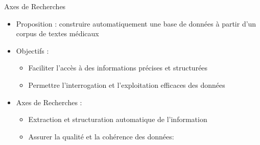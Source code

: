 \documentclass[english,french,table,aspectratio=43]{beamer}
\renewcommand{\_}{\ifincsname_\else\legacyunderscore\fi}
\begin{document}
\begin{frame}{Axes de Recherches}
  \begin{itemize}
      \item Proposition : construire automatiquement une base de données à partir d'un corpus de textes médicaux
      \vfill\pause
      \item Objectifs :
      \begin{itemize}
          \item Faciliter l'accès à des informations précises et structurées
          \item Permettre l'interrogation et l'exploitation efficaces des données
      \end{itemize}
      \vfill\pause
      \item Axes de Recherches :
      \begin{itemize}
          \item Extraction et structuration automatique de l'information
          \item Assurer la qualité et la cohérence des données:
      \end{itemize}
  \end{itemize}
\end{frame}



\end{document}

